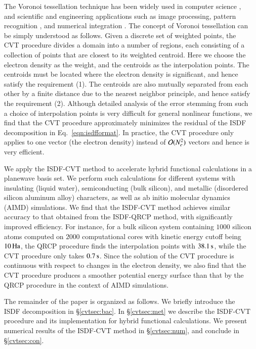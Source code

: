 The Voronoi tessellation technique has been widely used in computer science
\cite{aurenhammer1991voronoi}, and scientific and engineering applications such
as image processing\cite{du2006centroidal}, pattern recognition 
\cite{ogniewicz1995hierarchic}, and numerical integration 
\cite{becke1988multicenter}. The concept of Voronoi tessellation can be simply
understood as follows. Given a discrete set of weighted points, the CVT
procedure divides a domain  into a number of regions, each consisting of a
collection of points that are closest to its weighted centroid. Here we choose
the electron density as the weight, and the centroids as the interpolation
points. The centroids must be located where the electron density is significant,
and hence satisfy the requirement (1). The centroids are also mutually separated
from each other by a finite distance due to the nearest neighbor principle, and
hence satisfy the requirement (2). Although detailed analysis of the error
stemming from such a choice of interpolation points is very difficult for
general nonlinear functions, we find that the CVT procedure approximately
minimizes the residual of the ISDF decomposition in Eq.~\ref{eqn:isdfformat}.
In practice, the CVT procedure only applies to one vector (the electron density)
instead of $\mathcal{O}(N_{e}^2)$ vectors and hence is very efficient.

We apply the ISDF-CVT method to accelerate hybrid functional calculations in a
planewave basis set. We perform such calculations for different systems with
insulating (liquid water), semiconducting (bulk silicon), and metallic 
(disordered silicon aluminum alloy) characters, as well as ab initio molecular
dynamics (AIMD) simulations. We find that the ISDF-CVT method achieves similar
accuracy to that obtained from the ISDF-QRCP method, with significantly improved
efficiency. For instance, for a bulk silicon system containing $1000$ silicon
atoms computed on $2000$ computational cores with kinetic energy cutoff being
$10\operatorname{Ha}$, the QRCP procedure finds the interpolation points with $38.1\operatorname{s}$,
while the CVT procedure only takes $0.7\operatorname{s}$. Since the solution of the CVT
procedure is continuous with respect to changes in the electron density, we also
find that the CVT procedure produces a smoother potential energy surface than
that by the QRCP procedure in the context of AIMD simulations.

The remainder of the paper is organized as follows. We briefly introduce the
ISDF decomposition in \S \ref{cvtsec:bac}. In \S \ref{cvtsec:met} we describe
the ISDF-CVT procedure and its implementation for hybrid functional
calculations. We present numerical results of the ISDF-CVT method in \S \ref{cvtsec:num}, and conclude in \S \ref{cvtsec:con}.